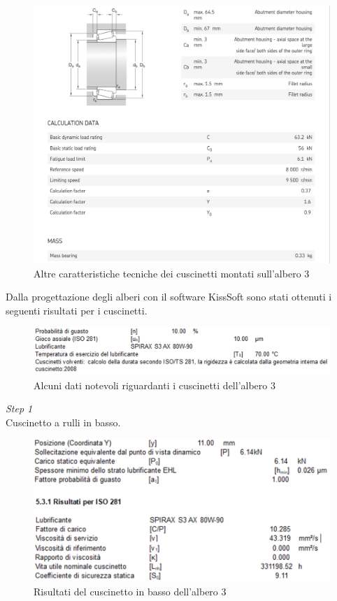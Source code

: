 \begin{figure}[h]
    \centering
    \includegraphics[scale=0.6]{Immagini/Cuscinetti2Albero3.png}
    \caption{Altre caratteristiche tecniche dei cuscinetti montati sull'albero 3}
    \label{fig:Cuscineti2Albero3}
\end{figure}

Dalla progettazione degli alberi con il software KissSoft sono stati ottenuti i seguenti risultati per i cuscinetti.
\begin{figure}[h]
    \centering
    \includegraphics[scale=0.6]{Immagini/DettagliCuscinettiAlbero3.png}
    \caption{Alcuni dati notevoli riguardanti i cuscinetti dell'albero 3}
    \label{fig:DettagliCuscinettiAlbero3}
\end{figure}
\newpage
\emph{Step 1}\\
Cuscinetto a rulli in basso.
\begin{figure}[h]
    \centering
    \includegraphics[scale=0.6]{Immagini/RisultatiCuscinettoBasso1Albero3.png}
    \caption{Risultati del cuscinetto in basso dell'albero 3}
    \label{fig:RisultatiCuscinettoBasso1Albero3}
\end{figure}

